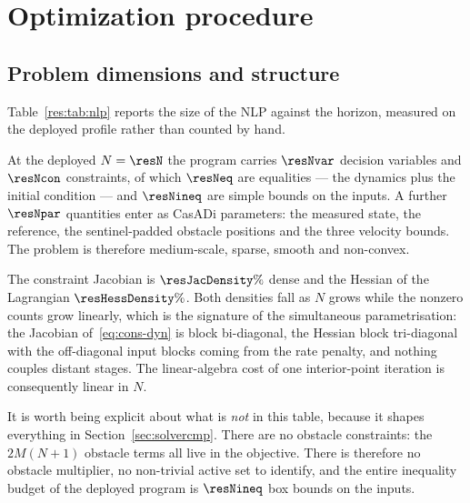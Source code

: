 \documentclass[11pt,a4paper]{article}
\begin{document}
\section{Optimization procedure}
\label{sec:optproc}

\subsection{Problem dimensions and structure}
\label{sec:dims}

Table~\ref{res:tab:nlp} reports the size of the NLP against the horizon, measured on the deployed profile
rather than counted by hand.

\begin{table}[htbp]
  \centering
  \small
  \caption{Size and sparsity of the NLP against the prediction horizon, from the deployed profile. Bold: the deployed configuration.}
  \label{res:tab:nlp}
\end{table}

At the deployed $N=\resN$ the program carries $\resNvar$ decision variables and $\resNcon$ constraints, of
which $\resNeq$ are equalities --- the dynamics plus the initial condition --- and $\resNineq$ are simple
bounds on the inputs. A further $\resNpar$ quantities enter as CasADi parameters: the measured state, the
reference, the sentinel-padded obstacle positions and the three velocity bounds. The problem is therefore
medium-scale, sparse, smooth and non-convex.

The constraint Jacobian is $\resJacDensity\%$ dense and the Hessian of the Lagrangian $\resHessDensity\%$.
Both densities fall as $N$ grows while the nonzero counts grow linearly, which is the signature of the
simultaneous parametrisation: the Jacobian of~\eqref{eq:cons-dyn} is block bi-diagonal, the Hessian block
tri-diagonal with the off-diagonal input blocks coming from the rate penalty, and nothing couples distant
stages. The linear-algebra cost of one interior-point iteration is consequently linear in $N$.

It is worth being explicit about what is \emph{not} in this table, because it shapes everything in
Section~\ref{sec:solvercmp}. There are no obstacle constraints: the $2M(N+1)$ obstacle terms all live in the
objective. There is therefore no obstacle multiplier, no non-trivial active set to identify, and the entire
inequality budget of the deployed program is $\resNineq$ box bounds on the inputs.
\end{document}
